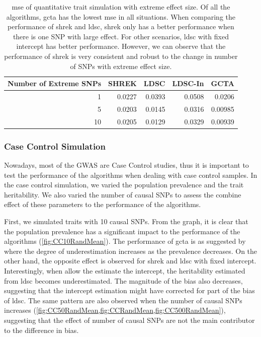 \documentclass[12pt]{scrbook}
\begin{document}
\begin{table}
	\centering
	\begin{tabular}{rrrrr}
		\toprule
		Number of Extreme SNPs&	SHREK&	LDSC&	LDSC-In&	GCTA \\
		\midrule
		1	&	0.0227	&	0.0393	&	0.0508	&	0.0206\\
		5	&	0.0203	&	0.0145	&	0.0316	&	0.00985\\
		10	&	0.0205	&	0.0129	&	0.0329	&	0.00939\\
		\bottomrule
	\end{tabular}
	\caption[MSE of Quantitative Trait Simulation with Extreme Effect Size]{
		\gls{mse} of quantitative trait simulation with extreme effect size.
		Of all the algorithms, \gls{gcta} has the lowest \gls{mse} in all situations.
		When comparing the performance of \gls{shrek} and \gls{ldsc}, \gls{shrek} only has a better performance when there is one \gls{SNP} with large effect. 
		For other scenarios, \gls{ldsc} with fixed intercept has better performance.
		However, we can observe that the performance of \gls{shrek} is very consistent and robust to the change in number of \glspl{SNP} with extreme effect size.
	}
	\label{tab:mseEx100c}
\end{table}

\subsubsection{Case Control Simulation}

Nowadays, most of the \gls{GWAS} are Case Control studies, thus it is important to test the performance of the algorithms when dealing with case control samples. 
In the case control simulation, we varied the population prevalence and the trait heritability. 
We also varied the number of causal \glspl{SNP} to assess the combine effect of these parameters to the performance of the algorithms.

First, we simulated traits with 10 causal \glspl{SNP}.
From the graph, it is clear that the population prevalence has a significant impact to the performance of the algorithms (\cref{fig:CC10RandMean}). 
The performance of \gls{gcta} is as suggested by \citet{Golan2014} where the degree of underestimation increases as the prevalence decreases.
On the other hand, the opposite effect is observed for \gls{shrek} and \gls{ldsc} with fixed intercept.
Interestingly, when allow the estimate the intercept, the heritability estimated from \gls{ldsc} becomes underestimated. 
The magnitude of the bias also decreases, suggesting that the intercept estimation might have corrected for part of the bias of \gls{ldsc}.
The same pattern are also observed when the number of causal \glspl{SNP} increases (\cref{fig:CC50RandMean,fig:CCRandMean,fig:CC500RandMean}), suggesting that the effect of number of causal \glspl{SNP} are not the main contributor to the difference in bias. 
\end{document}
